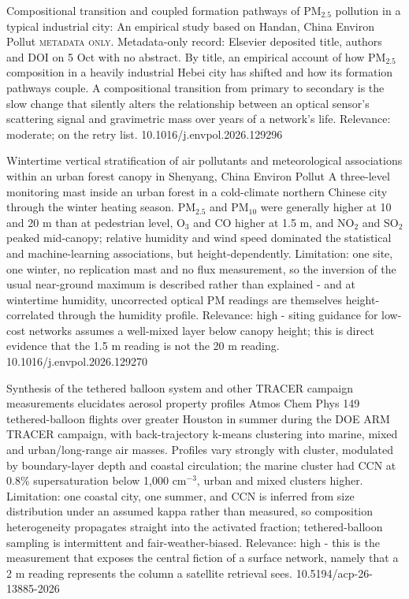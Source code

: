 \documentclass[10pt]{article}
\begin{document}
{Compositional transition and coupled formation pathways of PM$_{2.5}$ pollution in a typical industrial city: An empirical study based on Handan, China}
{Environ Pollut}
{\textsc{metadata only.} Metadata-only record: Elsevier deposited title, authors and DOI on 5 Oct with no abstract. By title, an empirical account of how PM$_{2.5}$ composition in a heavily industrial Hebei city has shifted and how its formation pathways couple. A compositional transition from primary to secondary is the slow change that silently alters the relationship between an optical sensor's scattering signal and gravimetric mass over years of a network's life. Relevance: moderate; on the retry list.}
{10.1016/j.envpol.2026.129296}

\par{}\baselineskip{}\baselineskip
{}

{Wintertime vertical stratification of air pollutants and meteorological associations within an urban forest canopy in Shenyang, China}
{Environ Pollut}
{A three-level monitoring mast inside an urban forest in a cold-climate northern Chinese city through the winter heating season. PM$_{2.5}$ and PM$_{10}$ were generally higher at 10 and 20 m than at pedestrian level, O$_3$ and CO higher at 1.5 m, and NO$_2$ and SO$_2$ peaked mid-canopy; relative humidity and wind speed dominated the statistical and machine-learning associations, but height-dependently. Limitation: one site, one winter, no replication mast and no flux measurement, so the inversion of the usual near-ground maximum is described rather than explained - and at wintertime humidity, uncorrected optical PM readings are themselves height-correlated through the humidity profile. Relevance: high - siting guidance for low-cost networks assumes a well-mixed layer below canopy height; this is direct evidence that the 1.5 m reading is not the 20 m reading.}
{10.1016/j.envpol.2026.129270}

{Synthesis of the tethered balloon system and other TRACER campaign measurements elucidates aerosol property profiles}
{Atmos Chem Phys}
{149 tethered-balloon flights over greater Houston in summer during the DOE ARM TRACER campaign, with back-trajectory k-means clustering into marine, mixed and urban/long-range air masses. Profiles vary strongly with cluster, modulated by boundary-layer depth and coastal circulation; the marine cluster had CCN at 0.8\% supersaturation below 1,000 cm$^{-3}$, urban and mixed clusters higher. Limitation: one coastal city, one summer, and CCN is inferred from size distribution under an assumed kappa rather than measured, so composition heterogeneity propagates straight into the activated fraction; tethered-balloon sampling is intermittent and fair-weather-biased. Relevance: high - this is the measurement that exposes the central fiction of a surface network, namely that a 2 m reading represents the column a satellite retrieval sees.}
{10.5194/acp-26-13885-2026}
\end{document}
